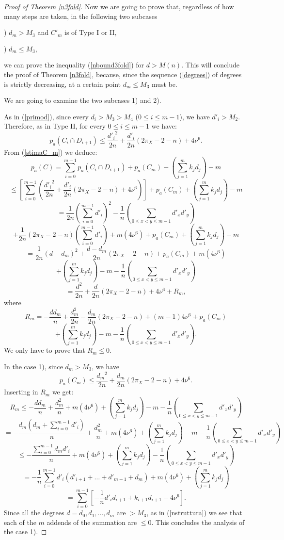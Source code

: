 \documentclass[9pt,a4paper]{amsart}
\theoremstyle{plain}
\theoremstyle{definition}
\theoremstyle{remark}
\begin{document}
\begin{proof}[Proof of Theorem \ref{n3fold}]
\smallskip
Now we are going  to prove that, regardless of how many steps are
taken, in the following two subcases


) $d_m>M_3$ and $C'_m$ is of Type I or II,



) $d_m\leq M_3$,


we can prove the inequality (\ref{nbound3fold}) for $d>M(n)$. This
will conclude the proof of  Theorem \ref{n3fold}, because, since the
sequence (\ref{degrees}) of degrees is strictly decreasing, at a
certain point $d_m\leq M_3$ must be.


\smallskip
We are going to examine the two subcases 1) and 2).

As in (\ref{primod}), since every $d_i>M_3>M_4$ ($0\leq i\leq m-1$),
we have $d'_i>M_2$. Therefore, as  in Type II, for every  $0\leq
i\leq m-1$ we have:
$$
p_a(C_i\cap D_{i+1})\leq
\frac{{d'_i}^2}{2n}+\frac{d'_i}{2n}(2\pi_X-2-n)+4\nu^6.
$$
From (\ref{stimaC_m}) we deduce:
$$
p_a(C)=\sum_{i=0}^{m-1}p_a(C_i\cap
D_{i+1})+p_a(C_m)+\left(\sum_{j=1}^{m}k_jd_j\right)-m
$$
$$
\leq
\left[\sum_{i=0}^{m-1}\left(\frac{{d'_i}^2}{2n}+\frac{d'_i}{2n}(2\pi_X-2-n)+4\nu^6\right)\right]+p_a(C_m)+\left(\sum_{j=1}^{m}k_jd_j\right)-m
$$
$$
=\frac{1}{2n}\left(\sum_{i=0}^{m-1}{d'_i}\right)^2
-\frac{1}{n}\left(\sum_{0\leq x<y\leq m-1}d'_xd'_y\right)
$$
$$
+\frac{1}{2n}(2\pi_X-2-n)\left(\sum_{i=0}^{m-1}d'_i\right)+m(4\nu^6)+p_a(C_m)+\left(\sum_{j=1}^{m}k_jd_j\right)-m
$$
$$
=\frac{1}{2n}(d-d_m)^2+\frac{d-d_m}{2n}(2\pi_X-2-n)+p_a(C_m)+m(4\nu^6)
$$
$$
+\left(\sum_{j=1}^{m}k_jd_j\right)-m-\frac{1}{n}\left(\sum_{0\leq
x<y\leq m-1}d'_xd'_y\right)
$$
$$
=\frac{{d}^2}{2n}+\frac{d}{2n}(2\pi_X-2-n)+4\nu^6 + R_m,
$$
where
$$
R_m=-\frac{dd_m}{n}+\frac{d_m^2}{2n}-\frac{d_m}{2n}(2\pi_X-2-n)+(m-1)4\nu^6+p_a(C_m)
$$
$$
+\left(\sum_{j=1}^{m}k_jd_j\right)-m-\frac{1}{n}\left(\sum_{0\leq
x<y\leq m-1}d'_xd'_y\right).
$$
We only have to prove that $R_m\leq 0$.

\smallskip
In the case 1), since $d_m>M_3$, we have
$$
p_a(C_m)\leq \frac{{d_m}^2}{2n}+\frac{d_m}{2n}(2\pi_X-2-n)+4\nu^6.
$$
Inserting in $R_m$ we get:
$$
R_m\leq
-\frac{dd_m}{n}+\frac{d_m^2}{n}+m(4\nu^6)+\left(\sum_{j=1}^{m}k_jd_j\right)-m-\frac{1}{n}\left(\sum_{0\leq
x<y\leq m-1}d'_xd'_y\right)
$$
$$
=-\frac{d_m(d_m+\sum_{i=0}^{m-1}d'_i)}{n}+\frac{d_m^2}{n}+m(4\nu^6)+\left(\sum_{j=1}^{m}k_jd_j\right)-m-\frac{1}{n}\left(\sum_{0\leq
x<y\leq m-1}d'_xd'_y\right)
$$
$$
\leq
-\frac{\sum_{i=0}^{m-1}d_md'_i}{n}+m(4\nu^6)+\left(\sum_{j=1}^{m}k_jd_j\right)-\frac{1}{n}\left(\sum_{0\leq
x<y\leq m-1}d'_xd'_y\right)
$$
$$
=-\frac{1}{n}\sum_{i=0}^{m-1}d'_i\left(d'_{i+1}+\dots+d'_{m-1}+d_m\right)+m(4\nu^6)+\left(\sum_{j=1}^{m}k_jd_j\right)
$$
$$
=\sum_{i=0}^{m-1}\left[-\frac{1}{n}d'_id_{i+1}+k_{i+1}d_{i+1}+4\nu^6\right].
$$
Since all the degrees $d=d_0,d_1,\dots,d_m$ are $>M_3$, as in
(\ref{nstruttura}) we see that each of the $m$ addends of the
summation are $\leq 0$. This concludes the analysis of the case 1).



\end{proof}
\end{document}
